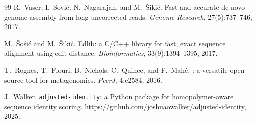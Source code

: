 \documentclass[11pt]{article}
\begin{document}
\begin{thebibliography}{99}
R.~Vaser, I.~Sovi\'{c}, N.~Nagarajan, and M.~\v{S}iki\'{c}.
\newblock Fast and accurate de novo genome assembly from long uncorrected
reads.
\newblock \emph{Genome Research}, 27(5):737--746, 2017.

M.~\v{S}o\v{s}i\'{c} and M.~\v{S}iki\'{c}.
\newblock Edlib: a {C/C++} library for fast, exact sequence alignment using
edit distance.
\newblock \emph{Bioinformatics}, 33(9):1394--1395, 2017.

T.~Rognes, T.~Flouri, B.~Nichols, C.~Quince, and F.~Mah\'{e}.
: a versatile open source tool for metagenomics.
\newblock \emph{PeerJ}, 4:e2584, 2016.

J.~Walker.
\newblock \texttt{adjusted-identity}: a {Python} package for
homopolymer-aware sequence identity scoring.
\newblock \url{https://github.com/joshuaowalker/adjusted-identity}, 2025.

\end{thebibliography}
\end{document}
